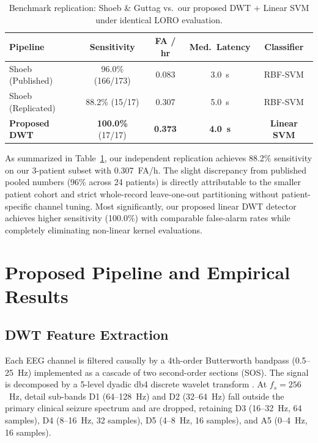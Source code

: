 \documentclass[10pt,twocolumn,letterpaper]{article}
\begin{document}
\begin{table}[h]
\centering
\small
\caption{Benchmark replication: Shoeb \& Guttag vs.\ our proposed DWT + Linear SVM under identical LORO evaluation.}
\label{tab:replication}
\begin{tabularx}{\columnwidth}{lcccc}
\toprule
\textbf{Pipeline} & \textbf{Sensitivity} & \textbf{FA / hr} & \textbf{Med.\ Latency} & \textbf{Classifier} \\
\midrule
Shoeb (Published) \cite{shoeb2010icml} & 96.0\% (166/173) & 0.083 & 3.0~s & RBF-SVM \\
Shoeb (Replicated) & 88.2\% (15/17) & 0.307 & 5.0~s & RBF-SVM \\
\textbf{Proposed DWT} & \textbf{100.0\%} (17/17) & \textbf{0.373} & \textbf{4.0~s} & \textbf{Linear SVM} \\
\bottomrule
\end{tabularx}
\end{table}

As summarized in Table~\ref{tab:replication}, our independent replication achieves 88.2\% sensitivity on our 3-patient subset with 0.307~FA/h. The slight discrepancy from published pooled numbers (96\% across 24 patients) is directly attributable to the smaller patient cohort and strict whole-record leave-one-out partitioning without patient-specific channel tuning. Most significantly, our proposed linear DWT detector achieves higher sensitivity (100.0\%) with comparable false-alarm rates while completely eliminating non-linear kernel evaluations.

\section{Proposed Pipeline and Empirical Results}
\label{sec:results}

\subsection{DWT Feature Extraction}
Each EEG channel is filtered causally by a 4th-order Butterworth bandpass (0.5--25~Hz) implemented as a cascade of two second-order sections (SOS). The signal is decomposed by a 5-level dyadic db4 discrete wavelet transform \cite{daubechies1988orthonormal,mallat1989theory}. At $f_s = 256$~Hz, detail sub-bands D1 (64--128~Hz) and D2 (32--64~Hz) fall outside the primary clinical seizure spectrum and are dropped, retaining D3 (16--32~Hz, 64 samples), D4 (8--16~Hz, 32 samples), D5 (4--8~Hz, 16 samples), and A5 (0--4~Hz, 16 samples).
\end{document}
